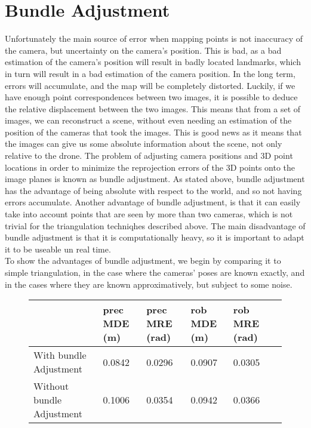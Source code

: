 \section{Bundle Adjustment}
Unfortunately the main source of error when mapping points is not inaccuracy of the camera, but uncertainty on the camera's position. This is bad, as a bad estimation of the camera's position will result in badly located landmarks, which in turn will result in a bad estimation of the camera position. In the long term, errors will accumulate, and the map will be completely distorted. Luckily, if we have enough point correspondences between two images, it is possible to deduce the relative displacement between the two images. This means that from a set of images, we can reconstruct a scene, without even needing an estimation of the position of the cameras that took the images. This is good news as it means that the images can give us some absolute information about the scene, not only relative to the drone. The problem of adjusting camera positions and 3D point locations in order to minimize the reprojection errors of the 3D points onto the image planes is known as bundle adjustment. As stated above, bundle adjustment has the advantage of being absolute with respect to the world, and so not having errors accumulate. Another advantage of bundle adjustment, is that it can easily take into account points that are seen by more than two cameras, which is not trivial for the triangulation techniqhes described above. The main disadvantage of bundle adjustment is that it is computationally heavy, so it is important to adapt it to be useable un real time.\\
To show the advantages of bundle adjustment, we begin by comparing it to simple triangulation, in the case where the cameras' poses are known exactly, and in the cases where they are known approximatively, but subject to some noise.

\begin{figure}[H]
  \begin{center}
    \begin{tabular}{ | l | l | l | l | l | l |}
      \hline
                                & prec MDE (m) & prec MRE (rad) &  rob MDE (m) & rob MRE (rad)  \\ \hline \hline
      With bundle Adjustment    & 0.0842       & 0.0296         &  0.0907      &  0.0305 \\ \hline
      Without bundle Adjustment & 0.1006       & 0.0354         &  0.0942      &  0.0366 \\
      \hline
    \end{tabular}
  \end{center}
\end{figure}


